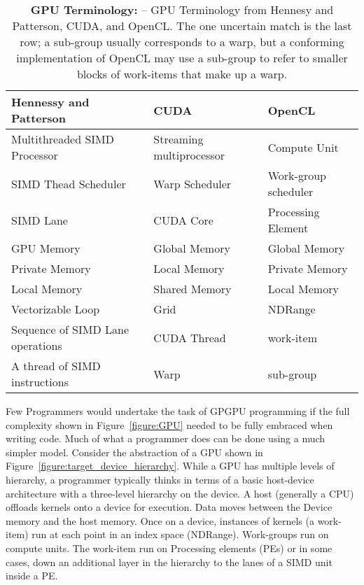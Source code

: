 \begin{table}[!htbp]
\centering
\caption{\textbf{GPU Terminology: } 
-- \small
GPU Terminology from Hennesy and Patterson, CUDA, and 
OpenCL.   The one uncertain match is the last row;
a sub-group usually corresponds to a warp, but a conforming implementation of OpenCL 
may use a sub-group to refer to smaller blocks of work-items that make up a warp.}
\label{table:GPUjargon}
\begin{tabular}{|l|l|l|}
\hline
\textbf{Hennessy and Patterson}  & \textbf{CUDA} & \textbf{OpenCL} \\
\hline
Multithreaded SIMD Processor    & Streaming multiprocessor & Compute Unit \\
\hline
SIMD Thead Scheduler               & Warp Scheduler                 & Work-group scheduler \\
\hline
SIMD Lane                                  & CUDA Core                        & Processing Element \\
\hline
GPU Memory                              & Global Memory                   & Global Memory \\
\hline
Private Memory                          & Local Memory                     & Private Memory \\
\hline
Local Memory                            & Shared Memory                   & Local Memory \\
\hline
Vectorizable Loop                       & Grid                                     & NDRange \\
\hline
Sequence of SIMD Lane operations & CUDA Thread                & work-item \\
\hline
A thread of SIMD instructions            & Warp                              & sub-group \\
\hline
\end{tabular}
\end{table}

Few Programmers would undertake the task of GPGPU programming if the full complexity shown in Figure~\ref{figure:GPU}
needed to be fully embraced when writing code.  Much of what a programmer does can be done using a much 
simpler model.  Consider the abstraction of a GPU shown in Figure~\ref{figure:target_device_hierarchy}.
While a GPU has multiple levels of hierarchy, a programmer typically thinks in terms of a basic host-device
architecture with a three-level hierarchy on the device.  A host (generally a CPU) offloads kernels onto a device
for execution.   Data moves between the Device memory and the host memory.   Once on a device, instances 
of kernels (a work-item) run at each point in an index space (NDRange).  Work-groups run on compute units.
The work-item run on Processing elements (PEs) or in some cases, down an additional layer in the hierarchy to 
the lanes of a SIMD unit inside a PE.

